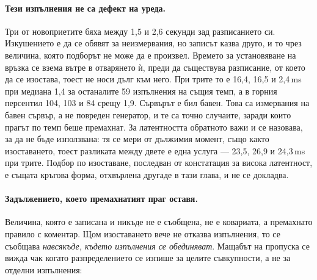 \paragraph{Тези изпълнения не са дефект на уреда.} Три от новоприетите бяха между 1,5 и 2,6 секунди
зад разписанието си. Изкушението е да се обявят за неизмервания, но записът казва друго, и то чрез
величина, която подборът не може да е произвел. Времето за установяване на връзка се взема вътре в
отварянето ѝ, преди да съществува разписание, от което да се изостава, тоест не носи дълг към него.
При трите то е 16,4, 16,5 и 2,4\,ms при медиана 1,4 за останалите 59 изпълнения на същия темп, а в
горния персентил 104, 103 и 84 срещу 1,9. Сървърът е бил бавен. Това са измервания на бавен сървър,
а не повреден генератор, и те са точно случаите, заради които прагът по темп беше премахнат.
За латентността обратното важи и се назовава, за да не бъде използвана: тя се мери от дължимия
момент, също както изоставането, тоест разликата между двете е една услуга — 23,5, 26,9 и
24,3\,ms при трите. Подбор по изоставане, последван от констатация за висока латентност, е същата
кръгова форма, отхвърлена другаде в тази глава, и не се докладва.

\paragraph{Задължението, което премахнатият праг оставя.} Величина, която е записана и никъде не е
съобщена, не е ковариата, а премахнато правило с коментар. Щом изоставането вече не отказва
изпълнения, то се съобщава \emph{навсякъде, където изпълнения се обединяват}. Мащабът на пропуска се
вижда чак когато разпределението се изпише за целите съвкупности, а не за отделни изпълнения:

